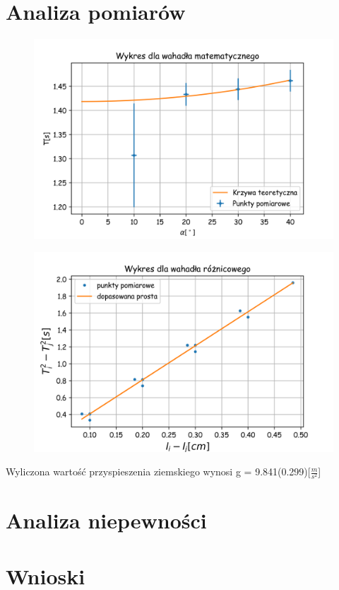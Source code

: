 \documentclass[a4paper,10pt]{article}
\begin{document}
\section{Analiza pomiarów}
\begin{figure}[H]
    \includegraphics{./Wykres_matematyczne.png}
    \caption{}
    \label{}
\end{figure}

\begin{figure}[H]
    \includegraphics{./Wykres_roznicowe.png}
    \caption{}
    \label{}
\end{figure}

Wyliczona wartość przyspieszenia ziemskiego wynosi g = 9.841(0.299)[$\frac{m}{s^2}$]
\section{Analiza niepewności}

\section{Wnioski}
\end{document}
